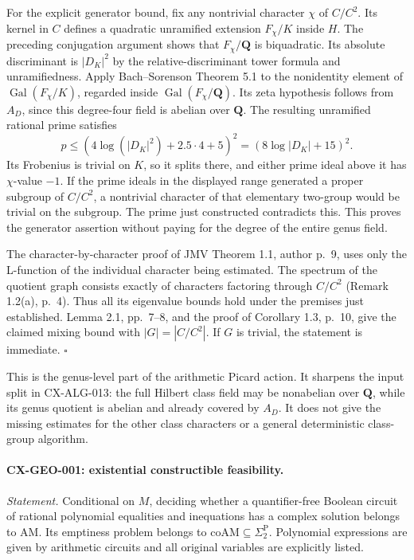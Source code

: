 \documentclass[11pt,a4paper]{article}
\begin{document}
For the explicit generator bound, fix any nontrivial character $\chi$ of
$C/C^2$. Its kernel in $C$ defines a quadratic unramified extension
$F_\chi/K$ inside $H$. The preceding conjugation argument shows that
$F_\chi/\mathbf Q$ is biquadratic. Its absolute discriminant is
$|D_K|^2$ by the relative-discriminant tower formula and unramifiedness.
Apply Bach--Sorenson Theorem 5.1 to the nonidentity element of
$\operatorname{Gal}(F_\chi/K)$, regarded inside
$\operatorname{Gal}(F_\chi/\mathbf Q)$. Its zeta hypothesis follows from
$A_D$, since this degree-four field is abelian over $\mathbf Q$.
The resulting unramified rational prime satisfies
\[
            p\le(4\log(|D_K|^2)+2.5\cdot4+5)^2
                    =(8\log|D_K|+15)^2.
\]
Its Frobenius is trivial on $K$, so it splits there, and either prime
ideal above it has $\chi$-value $-1$. If the prime ideals in the displayed
range generated a proper subgroup of $C/C^2$, a nontrivial character of
that elementary two-group would be trivial on the subgroup. The prime just
constructed contradicts this. This proves the generator assertion without
paying for the degree of the entire genus field.

The character-by-character proof of JMV Theorem 1.1, author p.~9,
uses only the L-function of the individual character being estimated.
The spectrum of the quotient graph consists exactly of characters
factoring through $C/C^2$ (Remark 1.2(a), p.~4). Thus all its eigenvalue
bounds hold under the premises just established. Lemma 2.1, pp.~7--8,
and the proof of Corollary 1.3, p.~10, give the claimed mixing bound
with $|G|=|C/C^2|$. If $G$ is trivial, the statement is immediate.
\hfill$\square$

This is the genus-level part of the arithmetic Picard action. It sharpens
the input split in CX-ALG-013: the full Hilbert class field may be
nonabelian over $\mathbf Q$, while its genus quotient is abelian and
already covered by $A_D$. It does not give the missing estimates for the
other class characters or a general deterministic class-group algorithm.

\paragraph{CX-GEO-001: existential constructible feasibility.}
\emph{Statement.} Conditional on $M$, deciding whether a quantifier-free
Boolean circuit of rational polynomial equalities and inequations has a
complex solution belongs to $\mathrm{AM}$. Its emptiness problem belongs to
$\mathrm{coAM}\subseteq\Sigma_2^{\mathrm P}$. Polynomial expressions are
given by arithmetic circuits and all original variables are explicitly listed.
\end{document}
